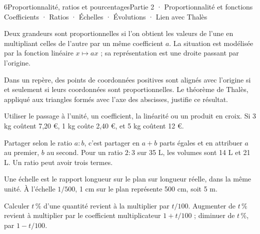 \begin{ouverture}[courbe]{6}{Proportionnalité, ratios et pourcentages}{Partie 2 · Proportionnalité et fonctions}
{Coefficients · Ratios · Échelles · Évolutions · Lien avec Thalès}
\end{ouverture}
\pagestyle{otMain}\essentiel\fontsize{11}{15}\selectfont
{}
\begin{definition}Deux grandeurs sont proportionnelles si l’on obtient les valeurs de l’une en multipliant celles de l’autre par un même coefficient $a$. La situation est modélisée par la fonction linéaire $x\mapsto ax$ ; sa représentation est une droite passant par l’origine.\end{definition}
\begin{propriete}Dans un repère, des points de coordonnées positives sont alignés avec l’origine si et seulement si leurs coordonnées sont proportionnelles. Le théorème de Thalès, appliqué aux triangles formés avec l’axe des abscisses, justifie ce résultat.\end{propriete}
\begin{savoirfaire}Utiliser le passage à l’unité, un coefficient, la linéarité ou un produit en croix. Si 3 kg coûtent 7,20 €, 1 kg coûte 2,40 €, et 5 kg coûtent 12 €.\end{savoirfaire}
\begin{definition}Partager selon le ratio $a:b$, c’est partager en $a+b$ parts égales et en attribuer $a$ au premier, $b$ au second. Pour un ratio $2:3$ sur 35 L, les volumes sont 14 L et 21 L. Un ratio peut avoir trois termes.\end{definition}
\begin{definition}Une échelle est le rapport longueur sur le plan sur longueur réelle, dans la même unité. À l’échelle $1/500$, 1 cm sur le plan représente 500 cm, soit 5 m.\end{definition}
\clearpage
{}
\begin{propriete}Calculer $t\,\%$ d’une quantité revient à la multiplier par $t/100$. Augmenter de $t\,\%$ revient à multiplier par le coefficient multiplicateur $1+t/100$ ; diminuer de $t\,\%$, par $1-t/100$.\end{propriete}
